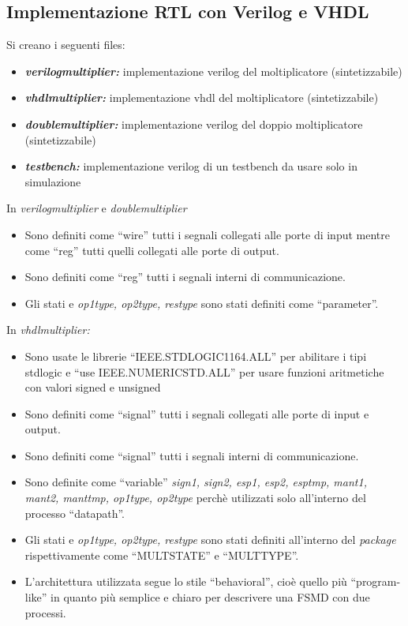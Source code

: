 \documentclass[]{IEEEtran}
\begin{document}
\subsection{Implementazione RTL con Verilog e VHDL}
Si creano i seguenti files:
\begin{itemize}
\item {\it\bf verilog\textunderscore multiplier:} implementazione verilog del moltiplicatore (sintetizzabile)
\item {\it\bf vhdl\textunderscore multiplier:} implementazione vhdl del moltiplicatore (sintetizzabile)
\item {\it\bf double\textunderscore multiplier:} implementazione verilog del doppio moltiplicatore (sintetizzabile)
\item {\it\bf testbench:} implementazione verilog di un testbench da usare solo in simulazione
\end{itemize}
In {\it verilog\textunderscore multiplier} e {\it double\textunderscore multiplier}
\begin{itemize}
\item Sono definiti come ``wire'' tutti i segnali collegati alle porte di input mentre come ``reg'' tutti quelli collegati alle porte di output.
\item Sono definiti come ``reg'' tutti i segnali interni di communicazione.
\item Gli stati e {\it op1\textunderscore type, op2\textunderscore type, res\textunderscore type} sono stati definiti come ``parameter''.
\end{itemize}
In {\it vhdl\textunderscore multiplier:}
\begin{itemize}
\item Sono usate le librerie ``IEEE.STD\textunderscore LOGIC\textunderscore 1164.ALL'' per abilitare i tipi std\textunderscore logic e ``use IEEE.NUMERIC\textunderscore STD.ALL'' per usare funzioni aritmetiche con valori signed e unsigned
\item Sono definiti come ``signal'' tutti i segnali collegati alle porte di input e output.
\item Sono definiti come ``signal'' tutti i segnali interni di communicazione.
\item Sono definite come ``variable'' {\it sign1, sign2, esp1, esp2, esp\textunderscore tmp, mant1, mant2, mant\textunderscore tmp, op1\textunderscore type, op2\textunderscore type} perchè utilizzati solo all'interno del processo ``datapath''.
\item Gli stati e {\it op1\textunderscore type, op2\textunderscore type, res\textunderscore type} sono stati definiti all'interno del {\it package} rispettivamente come ``MULT\textunderscore STATE'' e ``MULT\textunderscore TYPE''.
\item L'architettura utilizzata segue lo stile ``behavioral'', cioè quello più ``program-like'' in quanto più semplice e chiaro per descrivere una FSMD con due processi.
\end{itemize}
\end{document}
